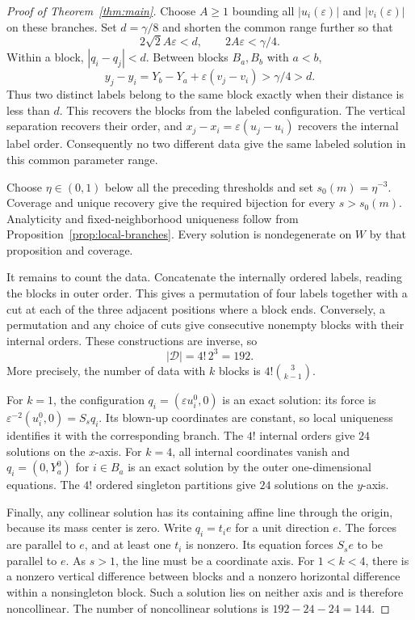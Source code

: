 \documentclass[11pt,a4paper]{amsart}
\numberwithin{equation}{section}
\newcommand{\eps}{\varepsilon}
\newcommand{\cD}{\mathcal D}
\begin{document}
\begin{proof}[Proof of Theorem~\ref{thm:main}]
Choose $A\ge1$ bounding all $|u_i(\eps)|$ and $|v_i(\eps)|$ on these
branches. Set $d=\gamma/8$ and shorten the common range further so that
\[
 2\sqrt2 A\eps<d,\qquad 2A\eps<\gamma/4.
\]
Within a block, $|q_i-q_j|<d$. Between blocks $B_a,B_b$ with $a<b$,
\[
 y_j-y_i=Y_b-Y_a+\eps(v_j-v_i)>\gamma/4>d.
\]
Thus two distinct labels belong to the same block exactly when their
distance is less than $d$. This recovers the blocks from the labeled
configuration. The vertical separation recovers their order, and
$x_j-x_i=\eps(u_j-u_i)$ recovers the internal label order. Consequently
no two different data give the same labeled solution in this common
parameter range.

Choose $\eta\in(0,1)$ below all the preceding thresholds and set
$s_0(m)=\eta^{-3}$. Coverage and unique recovery give the required
bijection for every $s>s_0(m)$. Analyticity and fixed-neighborhood
uniqueness follow from Proposition~\ref{prop:local-branches}. Every
solution is nondegenerate on $W$ by that proposition and coverage.

It remains to count the data. Concatenate the internally ordered
labels, reading the blocks in outer order. This gives a permutation
of four labels together with a cut at each of the three adjacent
positions where a block ends. Conversely, a permutation and any
choice of cuts give consecutive nonempty blocks with their internal
orders. These constructions are inverse, so
\[
 |\cD|=4!\,2^3=192.
\]
More precisely, the number of data with $k$ blocks is
$4!\binom{3}{k-1}$.

For $k=1$, the configuration $q_i=(\eps u_i^0,0)$ is an exact solution:
its force is $\eps^{-2}(u_i^0,0)=S_sq_i$. Its blown-up coordinates
are constant, so local uniqueness identifies it with the corresponding
branch. The $4!$ internal orders give $24$ solutions on the $x$-axis.
For $k=4$, all internal coordinates vanish and $q_i=(0,Y_a^0)$ for
$i\in B_a$ is an exact solution by the outer one-dimensional equations.
The $4!$ ordered singleton partitions give $24$ solutions on the $y$-axis.

Finally, any collinear solution has its containing affine line through
the origin, because its mass center is zero. Write $q_i=t_i e$ for a
unit direction $e$. The forces are parallel to $e$, and at least one
$t_i$ is nonzero. Its equation forces $S_se$ to be parallel to $e$.
As $s>1$, the line must be a coordinate axis. For $1<k<4$, there is a
nonzero vertical difference between blocks and a nonzero horizontal
difference within a nonsingleton block. Such a solution lies on neither
axis and is therefore noncollinear. The number of noncollinear
solutions is $192-24-24=144$.
\end{proof}
\end{document}
